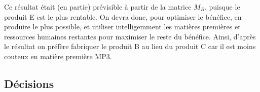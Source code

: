 Ce résultat était (en partie) prévisible à partir de la matrice $M_{B}$, puisque le produit E est le plus rentable. On devra donc, pour optimiser le bénéfice, en produire le plus possible, et utiliser intelligemment les matières premières et ressources humaines restantes pour maximiser le reste du bénéfice. Ainsi, d'après le résultat on préfère fabriquer le produit B au lieu du produit C car il est moins couteux en matière première MP3.


\subsection{Décisions}